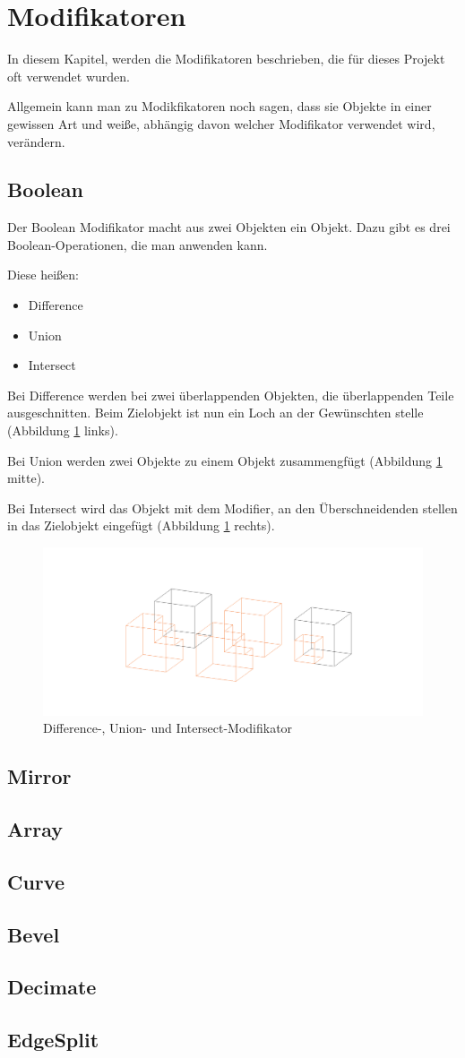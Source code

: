 \section{Modifikatoren}
In diesem Kapitel, werden die Modifikatoren beschrieben, die für dieses Projekt oft verwendet wurden.

Allgemein kann man zu Modikfikatoren noch sagen, dass sie Objekte in einer gewissen Art und weiße, abhängig davon welcher Modifikator verwendet wird, verändern.
\subsection{Boolean}
\citep{blender:boolean_modifier} Der Boolean Modifikator macht aus zwei Objekten ein Objekt. Dazu gibt es
drei Boolean-Operationen, die man anwenden kann.

Diese heißen:
\begin{itemize}
    \item  Difference
    \item  Union
    \item  Intersect
\end{itemize}

Bei Difference werden bei zwei überlappenden Objekten, die überlappenden Teile ausgeschnitten. Beim Zielobjekt ist nun ein Loch an der Gewünschten stelle (Abbildung \ref{modifikatoren:image1} links).

Bei Union werden zwei Objekte zu einem Objekt zusammengfügt (Abbildung \ref{modifikatoren:image1} mitte).

Bei Intersect wird das Objekt mit dem Modifier, an den Überschneidenden stellen in das Zielobjekt eingefügt (Abbildung \ref{modifikatoren:image1} rechts).

\begin{figure}[h]
    \centering
    \includegraphics[width=.8\textwidth]{images/Modifikatoren-Boolean.png}
    \caption{Difference-, Union- und Intersect-Modifikator}
    \label{modifikatoren:image1}
\end{figure}

\subsection{Mirror}
\subsection{Array}
\subsection{Curve}
\subsection{Bevel}
\subsection{Decimate}
\subsection{EdgeSplit}